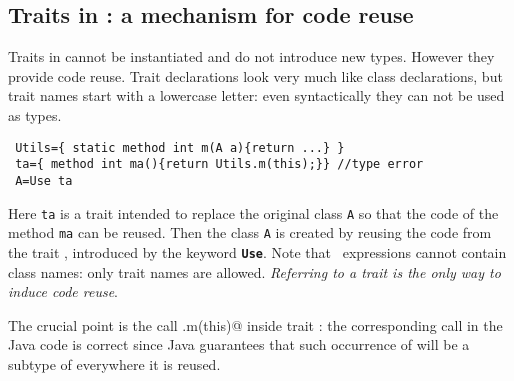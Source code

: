 \saveSpace
\subsection{Traits in \name: a mechanism for code reuse}
\saveSpace
Traits in \name cannot be instantiated and do not introduce new
types. However they provide code reuse.
Trait declarations 
look very much like class declarations, but trait names 
start with a lowercase letter: even syntactically they can not be used as types.
\saveSpace\saveSpace
\begin{lstlisting}
 Utils={ static method int m(A a){return ...} }
 ta={ method int ma(){return Utils.m(this);}} //type error
 A=Use ta
\end{lstlisting}
\saveSpace\saveSpace
\noindent Here \lstinline{ta} is a trait intended to replace the
original class \lstinline{A} so that the code of the method
\lstinline{ma} can be reused. Then the class \lstinline{A} 
is created by reusing the code from the trait \Q@ta@, introduced by the keyword 
{\bf \lstinline{Use}}. Note that \use\ expressions cannot contain class names: only trait
names are allowed.
\emph{Referring to a trait is the only way to induce code reuse}.

The crucial point is the call \Q@Utils.m(this)@ inside trait \Q@ta@:
the corresponding call in the Java code is correct since Java guarantees that such occurrence of \Q@this@ will be a subtype of \Q@A@ everywhere it is reused.

